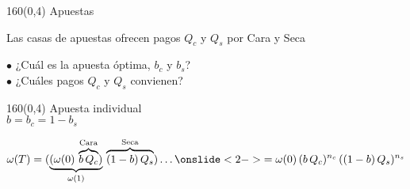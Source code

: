 \documentclass[shownotes,aspectratio=169]{beamer}
\begin{document}
\begin{frame}[plain]
\begin{textblock}{160}(0,4)
 \centering \LARGE Apuestas
\end{textblock}
\vspace{1cm}

Las casas de apuestas ofrecen pagos $Q_c$ y $Q_s$ por Cara y Seca

\vspace{1cm} \pause

$\bullet$ ¿Cuál es la apuesta óptima, $b_c$ y $b_s$? \\ \pause
$\bullet$ ¿Cuáles pagos $Q_c$ y $Q_s$ convienen?

\end{frame}



\begin{frame}[plain]
\begin{textblock}{160}(0,4)
 \centering \LARGE Apuesta individual \\
 \Large $b = b_c = 1 - b_s$
\end{textblock}
\vspace{1.5cm} 

\begin{equation*}
\omega(T) = (\underbrace{(\omega(0) \, \overbrace{b \,  Q_c}^{\text{Cara}})}_{\omega(1)} \, \overbrace{(1-b) \, Q_s}^{\text{Seca}}) \dots \onslide<2->{= \omega(0) \,  (b \,  Q_c)^{n_c}  \,  ((1-b) \, Q_s)^{n_s}}
\end{equation*}


\end{frame}
\end{document}
